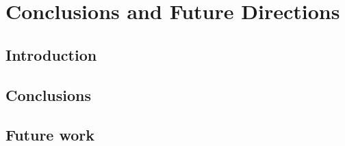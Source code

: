 %

\chapter{Conclusions and Future Directions} \label{chap:conclusions}

\section{Introduction} \label{sec:Intro}

\section{Conclusions}

\section{Future work}

